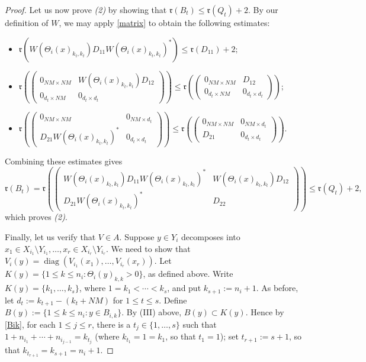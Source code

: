 \documentclass[12pt]{amsart}
\numberwithin{equation}{section}
\theoremstyle{definition}
\theoremstyle{remark}
\newcommand{\diag}{\operatorname{diag}}
\begin{document}
\begin{proof}
	Let us now prove \textit{(2)} by showing that $\mathfrak{r}(B_{t})\leq\mathfrak{r}(Q_{t})+2$. By our definition of $W$, we may apply \autoref{matrix} to obtain the following estimates:
	\begin{itemize}
		\item $\mathfrak{r}(W(\Theta_{i}(x)_{k_{t},k_{t}})D_{11}W(\Theta_{i}(x)_{k_{t},k_{t}})^{*})\leq \mathfrak{r}(D_{11})+2;$
		\vspace{5pt}
		\item $\mathfrak{r}\left(
		\begin{pmatrix}
		0_{NM\times NM} & W(\Theta_{i}(x)_{k_{t},k_{t}})D_{12}\\
		0_{d_{t}\times NM} & 0_{d_{t}\times d_{t}}
		\end{pmatrix}
		\right)\leq\mathfrak{r}\left(
		\begin{pmatrix}
		0_{NM\times NM} & D_{12}\\
		0_{d_{t}\times NM} & 0_{d_{t}\times d_{t}}
		\end{pmatrix}
		\right);$
		\vspace{5pt}
		\item $\mathfrak{r}\left(
		\begin{pmatrix}
		0_{NM\times NM} & 0_{NM\times d_{t}}\\
		D_{21}W(\Theta_{i}(x)_{k_{t},k_{t}})^{*} & 0_{d_{t}\times d_{t}}
		\end{pmatrix}
		\right)\leq\mathfrak{r}\left(
		\begin{pmatrix}
		0_{NM\times NM} & 0_{NM\times d_{t}}\\
		D_{21} & 0_{d_{t}\times d_{t}}
		\end{pmatrix}
		\right).$
	\end{itemize}	
	Combining these estimates gives 
	$$
	\mathfrak{r}(B_{t})=\mathfrak{r}\left(\begin{pmatrix}
	W(\Theta_{i}(x)_{k_{t},k_{t}})D_{11}W(\Theta_{i}(x)_{k_{t},k_{t}})^{*} & W(\Theta_{i}(x)_{k_{t},k_{t}})D_{12}\\
	D_{21}W(\Theta_{i}(x)_{k_{t},k_{t}})^{*} & D_{22}
	\end{pmatrix}\right)
	\leq \mathfrak{r}(Q_{t})+2,
	$$
	which proves \textit{(2)}. 
	
	Finally, let us verify that $V\in A$. Suppose $y\in Y_{i}$ decomposes into $x_{1}\in X_{i_{1}}\setminus Y_{i_{1}},\ldots,x_{r}\in X_{i_{r}}\setminus Y_{i_{r}}$. We need to show that $V_{i}(y)=\diag(V_{i_{1}}(x_{1}),\ldots,V_{i_{r}}(x_{r}))$. Let $K(y)=\{1\leq k\leq n_{i}:\Theta_{i}(y)_{k,k}>0\}$, as defined above. Write $K(y)=\{k_{1},\ldots,k_{s}\}$, where $1=k_{1}<\cdots<k_{s}$, and put $k_{s+1}:=n_{i}+1$. As before, let $d_{t}:=k_{t+1}-(k_{t}+NM)$ for $1\leq t\leq s$. Define $B(y):=\{1\leq k\leq n_{i}:y\in B_{i,k}\}$. By (III) above, $B(y)\subset K(y)$. Hence by \autoref{Bik}, for each $1\leq j\leq r$, there is a $t_{j}\in\{1,\ldots,s\}$ such that $1+n_{i_{1}}+\cdots+n_{i_{j-1}}=k_{t_{j}}$ (where $k_{t_{1}}=1=k_{1}$, so that $t_{1}=1$); set $t_{r+1}:=s+1$, so that $k_{t_{r+1}}=k_{s+1}=n_{i}+1$. 
	

\end{proof}
\end{document}
